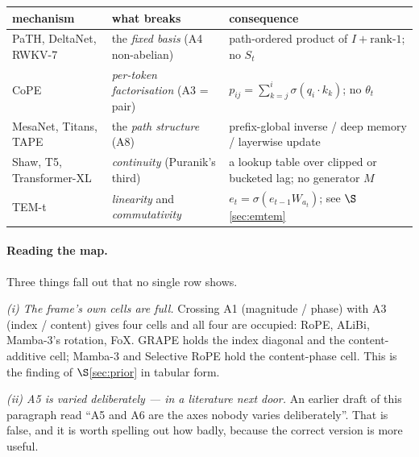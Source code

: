 \documentclass[11pt]{article}
\begin{document}
\begin{center}\small
\begin{tabular}{@{}p{}p{}p{}@{}}
\toprule
mechanism & what breaks & consequence \\
\midrule
PaTH, DeltaNet, RWKV-7 & the \emph{fixed basis} (A4 non-abelian)
  & path-ordered product of $I+\text{rank-}1$; no $S_t$ \\
CoPE         & \emph{per-token factorisation} (A3 = pair)
  & $p_{ij}=\sum_{k=j}^{i}\sigma(q_i\!\cdot\!k_k)$; no $\theta_t$ \\
MesaNet, Titans, TAPE & the \emph{path structure} (A8)
  & prefix-global inverse / deep memory / layerwise update \\
Shaw, T5, Transformer-XL & \emph{continuity} (Puranik's third)
  & a lookup table over clipped or bucketed lag; no generator $M$ \\
TEM-t        & \emph{linearity} and \emph{commutativity}
  & $e_t = \sigma(e_{t-1}W_{a_t})$; see $\S$\ref{sec:emtem} \\
\bottomrule
\end{tabular}
\end{center}

\paragraph{Reading the map.} Three things fall out that no single row shows.

\emph{(i) The frame's own cells are full.} Crossing A1 (magnitude / phase) with A3
(index / content) gives four cells and all four are occupied: RoPE, ALiBi,
Mamba-3's rotation, FoX. GRAPE holds the index diagonal and the content-additive
cell; Mamba-3 and Selective RoPE hold the content-phase cell. This is the finding
of $\S$\ref{sec:prior} in tabular form.

\emph{(ii) A5 is varied deliberately --- in a literature next door.} An earlier
draft of this paragraph read ``A5 and A6 are the axes nobody varies
deliberately''. That is false, and it is worth spelling out how badly, because the
correct version is more useful.
\end{document}
